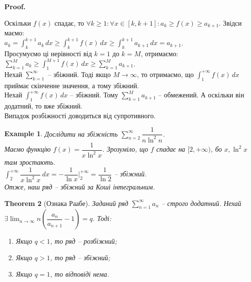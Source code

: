 \documentclass[a4paper, 10pt]{article}
\makeatletter
\def\huge{\displaystyle}
\theoremstyle{theoremdd}
\newtheorem{theorem}{Theorem}[subsection]
\theoremstyle{theoremdd}
\theoremstyle{theoremdd}
\theoremstyle{theoremdd}
\theoremstyle{theoremdd}
\newtheorem{example}[theorem]{Example}
\theoremstyle{theoremdd}
\theoremstyle{theoremdd}
\theoremstyle{theoremdd}
\theoremstyle{theoremdd}
\renewenvironment{proof}[1][Proof.\\]{\par
\pushQED{\hfill \qed}%
\normalfont \topsep6\p@\@plus6\p@\relax
\trivlist
\item\relax
{\bfseries
#1\@addpunct{.}}\hspace\labelsep\ignorespaces
}{%
\popQED\endtrivlist\@endpefalse
}
\makeatother
\begin{document}
\begin{proof}
Оскільки $f(x)$ спадає, то $\forall k \geq 1: \forall x \in [k, k+1]: a_k \geq f(x) \geq a_{k+1}$. Звідси маємо:\\
$\huge a_k = \int_k^{k+1} a_k \,dx \geq \int_k^{k+1} f(x)\,dx \geq \int_k^{k+1} a_{k+1}\,dx = a_{k+1}$.\\
Просумуємо ці нерівності від $k = 1$ до $k = M$, отримаємо:\\
$\huge \sum_{k=1}^M a_k \geq \int_1^{M+1} f(x)\,dx \geq \sum_{k=1}^M a_{k+1}$.\\
Нехай $\huge\sum_{k=1}^\infty$ -- збіжний. Тоді якщо $M \to \infty$, то отримаємо, що $\huge\int_1^{+\infty} f(x)\,dx$ приймає скінченне значення, а тому збіжний.\\
Нехай $\huge\int_1^{+\infty} f(x)\,dx$ -- збіжний. Тому $\huge\sum_{k=1}^M a_{k+1}$ -- обмежений. А оскільки він додатний, то вже збіжний.\\
Випадок розбіжності доводиться від супротивного.
\end{proof}

\begin{example}
Дослідити на збіжність $\huge\sum_{n=2}^\infty \dfrac{1}{n \ln^2 n}$.\\
Маємо функцію $f(x) = \dfrac{1}{x \ln^2 x}$. Зрозуміло, що $f$ спадає на $[2,+\infty)$, бо $x, \ln^2 x$ там зростають.\\
$\huge\int_2^{+\infty} \dfrac{1}{x \ln^2 x}\,dx = -\dfrac{1}{\ln x} \Big|_{2}^{+\infty} = \dfrac{1}{\ln 2}$ -- збіжний.\\
Отже, наш ряд -- збіжний за Коші інтегральним.
\end{example}

\begin{theorem}[Ознака Раабе]
Заданий ряд $\huge\sum_{n=1}^\infty a_n$ -- строго додатний. Нехай $\exists \huge\lim_{n \to \infty} n \left( \dfrac{a_n}{a_{n+1}} - 1 \right) = q$. Тоді:
\begin{enumerate}[nosep,wide=0pt,label={\arabic*)}]
\item Якщо $q < 1$, то ряд -- розбіжний;
\item Якщо $q > 1$, то ряд -- збіжний;
\item Якщо $q = 1$, то відповіді нема.
\end{enumerate}
\end{theorem}
\end{document}
